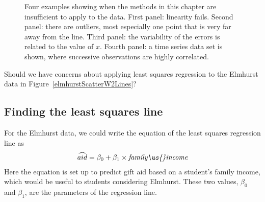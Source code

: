 \begin{figure}[h]
  \centering
  \caption{Four examples showing when the methods in this
      chapter are insufficient to apply to the data.
      First panel: linearity fails.
      Second panel: there are outliers, most especially
      one point that is very far away from the line.
      Third panel: the variability of the errors is related
      to the value of $x$.
      Fourth panel: a time series data set is shown,
      where successive observations are highly correlated.}
  \label{whatCanGoWrongWithLinearModel}
\end{figure}

\begin{exercisewrap}
\begin{nexercise}
Should we have concerns about applying least squares regression to the Elmhurst data in Figure~\ref{elmhurstScatterW2Lines}?\footnotemark
\end{nexercise}
\end{exercisewrap}


\D{\newpage}

\subsection{Finding the least squares line}
\label{findingTheLeastSquaresLineSection}

For the Elmhurst data, we could write the equation of the least squares regression line as
\begin{eqnarray*}
\widehat{aid} = \beta_0 + \beta_{1}\times
    \textit{family\us{}income}
\end{eqnarray*}
Here the equation is set up to predict gift aid based on a student's family income, which would be useful to students considering Elmhurst. These two values, $\beta_0$ and $\beta_1$, are the parameters of the regression line.

